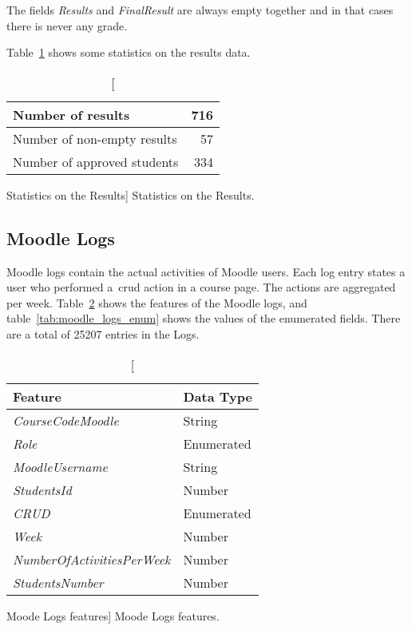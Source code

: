 The fields \textit{Results} and \textit{FinalResult} are always empty together
and in that cases there is never any grade.

Table~\ref{tab:results_stats} shows some statistics on the results data.

\begin{table}[h!]
    \centering

    \begin{tabular}{| l | r |}
        \hline
        Number of results           & 716 \\ \hline
        Number of non-empty results & 57  \\ \hline
        Number of approved students & 334 \\ \hline
    \end{tabular}

    \caption
        [Statistics on the Results]
        {Statistics on the Results.}

    \label{tab:results_stats}
\end{table}

\subsection{Moodle Logs}

Moodle logs contain the actual activities of Moodle users. Each log entry
states a user who performed a~\gls{crud} action in a course page. The actions
are aggregated per week. Table~\ref{tab:moodle_logs_features} shows the
features of the Moodle logs, and table~\ref{tab:moodle_logs_enum} shows the
values of the enumerated fields. There are a total of 25207 entries in the
Logs.

\begin{table}[h!]
    \centering

    \begin{tabular}{l l}
        Feature                            & Data Type  \\ \hline
        \textit{CourseCodeMoodle}          & String     \\
        \textit{Role}                      & Enumerated \\
        \textit{MoodleUsername}            & String     \\
        \textit{StudentsId}                & Number     \\
        \textit{CRUD}                      & Enumerated \\
        \textit{Week}                      & Number     \\
        \textit{NumberOfActivitiesPerWeek} & Number     \\
        \textit{StudentsNumber}            & Number     \\
    \end{tabular}

    \caption
        [Moode Logs features]
        {Moode Logs features.}

    \label{tab:moodle_logs_features}
\end{table}

